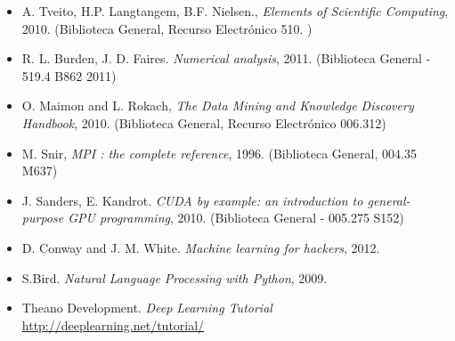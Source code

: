 \documentclass[letterpaper,10pt,onecolumn]{article}
\begin{document}
\begin{itemize}
\item A. Tveito, H.P. Langtangem, B.F. Nielsen., \textit{Elements of
  Scientific Computing}, 2010.  (Biblioteca General, Recurso
  Electr\'onico 510. )\\[-0.6cm] 
\item R. L. Burden, J. D. Faires. \textit{Numerical analysis},
  2011. (Biblioteca General - 519.4 B862 2011)\\[-0.6cm]
\item O. Maimon and L. Rokach, \textit{The Data Mining and Knowledge
  Discovery Handbook}, 2010. (Biblioteca General, Recurso
  Electr\'onico 006.312)\\[-0.6cm]
\item M. Snir, \textit{MPI : the complete reference},
  1996. (Biblioteca General, 004.35 M637)\\[-0.6cm]
\item J. Sanders, E. Kandrot. \textit{CUDA by example: an
  introduction to general-purpose GPU programming}, 2010. (Biblioteca
  General - 005.275 S152)\\[-0.6cm]
\item D. Conway and J. M. White. \textit{Machine learning for
    hackers}, 2012.\\[-0.6cm]
\item S.Bird. \textit{Natural Language Processing with
  Python}, 2009.\\[-0.6cm]
\item Theano Development. \textit{Deep Learning Tutorial}
  \url{http://deeplearning.net/tutorial/}  \\[-0.2cm]
\end{itemize}
\end{document}
